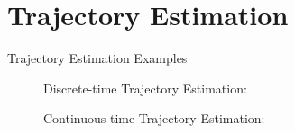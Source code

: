 \documentclass[8pt]{beamer}
\begin{document}
\section{Trajectory Estimation}
\begin{frame}{Trajectory Estimation Examples}

\begin{figure}
    \centering
    \begin{minipage}{0.48\textwidth}
        \textcolor{myNewColorA}{Discrete-time Trajectory Estimation:}
    \end{minipage}\hfill
    \begin{minipage}{0.48\textwidth}
        \textcolor{myNewColorA}{Continuous-time Trajectory Estimation:}
    \end{minipage}

    \vspace{0.5cm}  %


\end{figure}
\end{frame}
\end{document}

